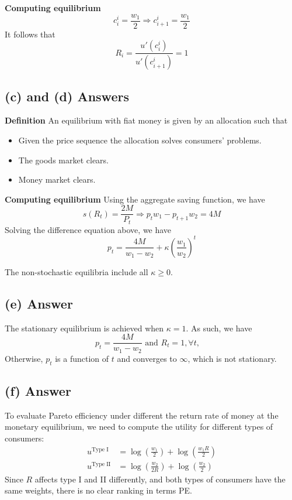 \documentclass[11pt]{article}
\theoremstyle{definition}
\theoremstyle{boldtitle} %
\numberwithin{equation}{section}
\numberwithin{figure}{section}
\numberwithin{table}{section}
\begin{document}
\noindent \textbf{Computing equilibrium} 
\[
c_i^i = \frac{w_1}{2} \Rightarrow c_{i+1}^i = \frac{w_1}{2}
\]
It follows that 
\[
R_i = \frac{u'(c^i_{i})}{u'(c^i_{i+1})} = 1
\]

\subsection{(c) and (d) Answers}
\textbf{Definition} An equilibrium with fiat money is given by an allocation such that 
\begin{itemize}
    \item Given the price sequence the allocation solves consumers' problems.
    \item The goods market clears.
    \item Money market clears.
\end{itemize}

\noindent \textbf{Computing equilibrium} 
Using the aggregate saving function, we have 
\[
s(R_t) = \frac{2M}{P_t} \Rightarrow p_t w_1 - p_{t+1} w_2 = 4M
\]
Solving the difference equation above, we have 
\[
p_t = \frac{4M}{w_1 - w_2} + \kappa \left(\frac{w_1}{w_2}\right)^t
\]

The non-stochastic equilibria include all $\kappa \geq 0$.

\subsection{(e) Answer}
The stationary equilibrium is achieved when $\kappa = 1$.
As such, we have 
\[
p_t = \frac{4M}{w_1 - w_2} \text{ and } R_t = 1 , \forall t, \quad 
\]
Otherwise, $p_t$ is a function of $t$ and converges to $\infty$, which is not stationary.

\subsection{(f) Answer}
To evaluate Pareto efficiency under different the return rate of money at the monetary equilibrium, 
we need to compute the utility for different types of consumers:
\begin{align*}
    u^\text{Type I} & = \log(\frac{w_1}{2}) + \log(\frac{w_1 R}{2}) \\
    u^\text{Type II} & = \log(\frac{w_2}{2R}) + \log(\frac{w_2}{2})
\end{align*}
Since $R$ affects type I and II differently, and both types of consumers have the same weights,
there is no clear ranking in terms PE.
\end{document}
